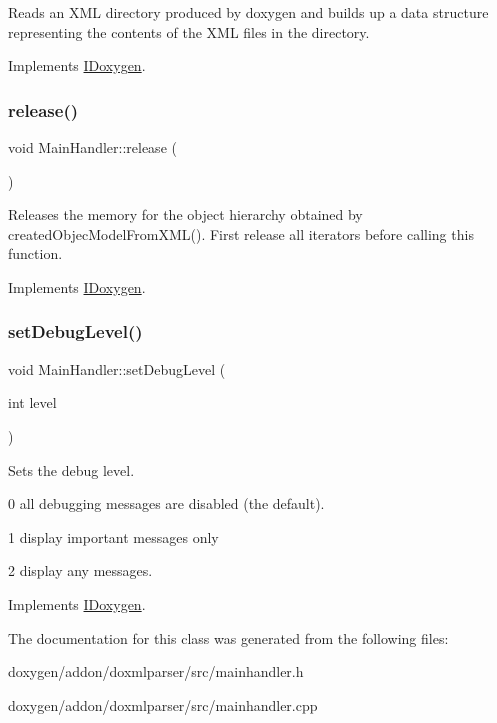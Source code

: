 Reads an X\+ML directory produced by doxygen and builds up a data structure representing the contents of the X\+ML files in the directory. 

Implements \mbox{\hyperlink{class_i_doxygen_a7959d93fba77caddee37b6d8370c10f0}{I\+Doxygen}}.

\mbox{\label{class_main_handler_a1f9507df93308fe3002cc2d97bd8c8be}} 
\subsubsection{\texorpdfstring{release()}{release()}}
{\footnotesize\ttfamily void Main\+Handler\+::release (\begin{DoxyParamCaption}{ }\end{DoxyParamCaption})\hspace{0.3cm}{\ttfamily [virtual]}}

Releases the memory for the object hierarchy obtained by created\+Objec\+Model\+From\+X\+M\+L(). First release all iterators before calling this function. 

Implements \mbox{\hyperlink{class_i_doxygen_a6865961012ad8e6c19b7575488046045}{I\+Doxygen}}.

\mbox{\label{class_main_handler_a4856c87039eb9235d0fa7e10d8912e55}} 
\subsubsection{\texorpdfstring{setDebugLevel()}{setDebugLevel()}}
{\footnotesize\ttfamily void Main\+Handler\+::set\+Debug\+Level (\begin{DoxyParamCaption}\item[{int}]{level }\end{DoxyParamCaption})\hspace{0.3cm}{\ttfamily [virtual]}}

Sets the debug level.
\begin{DoxyItemize}
\item 0 all debugging messages are disabled (the default).
\item 1 display important messages only
\item 2 display any messages. 
\end{DoxyItemize}

Implements \mbox{\hyperlink{class_i_doxygen_ae8e3759ffc6d64684dc500855f6fead6}{I\+Doxygen}}.



The documentation for this class was generated from the following files\+:\begin{DoxyCompactItemize}
\item 
doxygen/addon/doxmlparser/src/mainhandler.\+h\item 
doxygen/addon/doxmlparser/src/mainhandler.\+cpp\end{DoxyCompactItemize}

